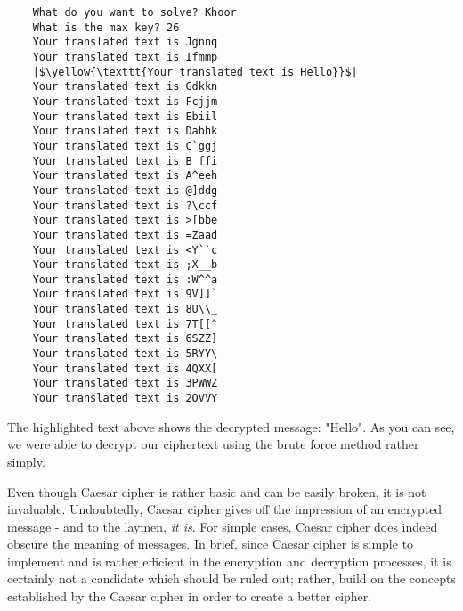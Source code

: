 \begin{verbatim}
    What do you want to solve? Khoor
    What is the max key? 26
    Your translated text is Jgnnq
    Your translated text is Ifmmp
    |$\yellow{\texttt{Your translated text is Hello}}$|
    Your translated text is Gdkkn
    Your translated text is Fcjjm
    Your translated text is Ebiil
    Your translated text is Dahhk
    Your translated text is C`ggj
    Your translated text is B_ffi
    Your translated text is A^eeh
    Your translated text is @]ddg
    Your translated text is ?\ccf
    Your translated text is >[bbe
    Your translated text is =Zaad
    Your translated text is <Y``c
    Your translated text is ;X__b
    Your translated text is :W^^a
    Your translated text is 9V]]`
    Your translated text is 8U\\_
    Your translated text is 7T[[^
    Your translated text is 6SZZ]
    Your translated text is 5RYY\
    Your translated text is 4QXX[
    Your translated text is 3PWWZ
    Your translated text is 2OVVY
\end{verbatim}
\begingroup
\endgroup

The highlighted text above shows the decrypted message: "Hello". As you can see, we were able to decrypt our ciphertext
using the brute force method rather simply. 

Even though Caesar cipher is rather basic and can be easily broken, it is not invaluable. Undoubtedly, Caesar cipher gives
off the impression of an encrypted message - and to the laymen, \textit{it is}. For simple cases, Caesar cipher does indeed
obscure the meaning of messages. In brief, since Caesar cipher is simple to implement and is rather efficient in the
encryption and decryption processes, it is certainly not a candidate which should be ruled out; rather, build on the 
concepts established by the Caesar cipher in order to create a better cipher.

